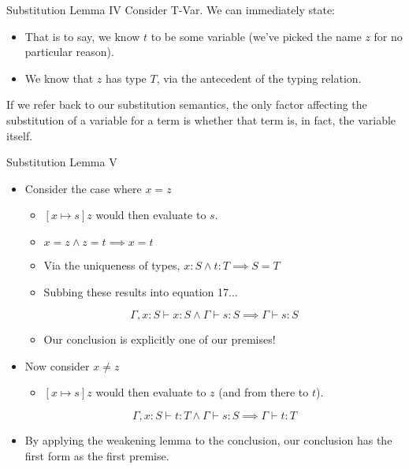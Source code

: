\documentclass[11pt]{beamer}
\begin{document}
\begin{frame}[fragile=singleslide]{Substitution Lemma IV}
Consider T-Var.  We can immediately state:
\begin{itemize}
\item That is to say, we know $t$ to be some variable (we've picked the name $z$ for no particular reason).
\item We know that $z$ has type $T$, via the antecedent of the typing relation.  
\end{itemize}
If we refer back to our substitution semantics, the only factor affecting the substitution of a variable for a term is whether that term is, in fact, the variable itself.  
\end{frame}


\begin{frame}[fragile=singleslide]{Substitution Lemma V}
\begin{itemize}
\item Consider the case where $x = z$
\begin{itemize}
\item $[x \mapsto s] z$ would then evaluate to $s$. 
\item $x = z \land z = t \implies x = t$  
\item Via the uniqueness of types, $x : S \land t : T \implies S = T$
\item Subbing these results into equation 17...
\end{itemize}
\begin{equation}
\Gamma, x : S \vdash x : S \land \Gamma \vdash s : S \implies \Gamma \vdash s : S
\end{equation}
\begin{itemize}
\item Our conclusion is explicitly one of our premises! 
\end{itemize}
\item Now consider $x \neq z$
\begin{itemize}
\item $[x \mapsto s] z$ would then evaluate to $z$ (and from there to $t$).
\end{itemize}
\begin{equation}
\Gamma, x : S \vdash t : T \land \Gamma \vdash s : S \implies \Gamma \vdash t : T
\end{equation}
\item By applying the weakening lemma to the conclusion, our conclusion has the first form as the first premise.  
\end{itemize}
\end{frame}
\end{document}

